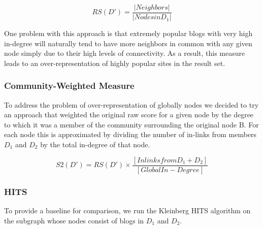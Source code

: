 \documentclass{sig-alternate-nocopyright}
\begin{document}
\begin{equation}
RS(D') = \frac{\lvert Neighbors \rvert}{\lvert Nodes in D_1 \rvert}
\end{equation}

One problem with this approach is that extremely popular blogs with
very high in-degree will naturally tend to have more neighbors in
common with any given node simply due to their high levels of
connectivity.  As a result, this measure leads to an
over-representation of highly popular sites in the result set.

\subsubsection{Community-Weighted Measure}
To address the problem of over-representation of globally 
nodes we decided to try an approach that weighted the original raw
score for a given node by the degree to which it was a member of the
community surrounding the original node B.  For each node this is
approximated by dividing the number of in-links from members $D_1$ and $D_2$
by the total in-degree of that node.

\begin{equation}
S2(D') = RS(D') \times \frac{[Inlinks from D_1 + D_2]}{[ Global In-Degree]}
\end{equation}

\subsubsection{HITS}
To provide a baseline for comparison, we run the Kleinberg HITS
algorithm on the subgraph whose nodes consist of blogs in $D_1$ and
$D_2$.
\end{document}
